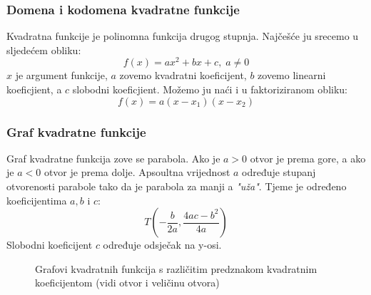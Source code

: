 \newcommand{\kvad}{kvadratne funkcije}

\subsubsection{Domena i kodomena \kvad}
    Kvadratna funkcije je polinomna funkcija drugog stupnja. Najčešće ju srecemo u sljedećem obliku:
    \[f(x) = ax^2 + bx + c,\; a \neq 0\]
    \(x\) je argument funkcije, \(a\) zovemo kvadratni koeficijent, \(b\) zovemo linearni koeficjient, a \(c\) slobodni koeficjient.
    Možemo ju naći i u faktoriziranom obliku:
    \[f(x) = a(x - x_1)(x - x_2)\]

\subsubsection{Graf \kvad}
    Graf kvadratne funkcija zove se parabola.
    Ako je \(a > 0\) otvor je prema gore, a ako je \(a < 0\) otvor je prema dolje.
    Apsoultna vrijednost \(a\) određuje stupanj otvorenosti parabole tako da je parabola za manji a \emph{"uža"}.
    Tjeme je određeno koeficijentima \(a, b\) i \(c\):
    \[T(-\frac{b}{2a}, \frac{4ac - b^2}{4a})\]
    Slobodni koeficijent \(c\) određuje odsječak na y-osi.
    \begin{figure}[ht]
        \centering
        \caption{Grafovi kvadratnih funkcija s različitim predznakom kvadratnim koeficijentom (vidi otvor i veličinu otvora)}
        \label{fig:template}
    \end{figure}
